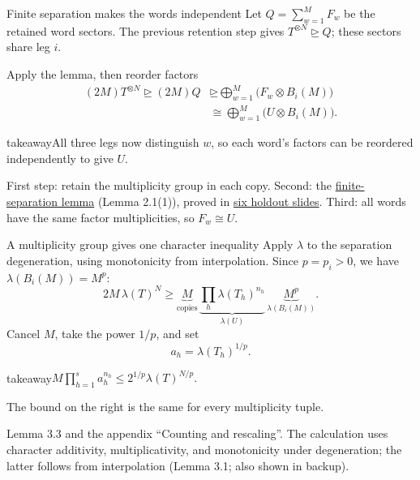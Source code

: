 \documentclass[aspectratio=169,11pt]{beamer}
\newcommand{\degen}{\unrhd}
\newcommand{\source}[1]{\vfill\par{\fontsize{7.5}{9}\selectfont\color{muted}#1\par}}
\newcommand{\takeaway}[1]{\begin{beamercolorbox}[sep=0.65em,wd=\linewidth]{takeaway}#1\end{beamercolorbox}}
\begin{document}
\begin{frame}{Finite separation makes the words independent}
  Let $Q=\sum_{w=1}^{M}F_w$ be the retained word sectors.
  The previous retention step gives $T^{\otimes N}\degen Q$;
  these sectors share leg $i$.
  \begin{block}{Apply the lemma, then reorder factors}
    \[
    \begin{aligned}
      (2M)T^{\otimes N}\degen(2M)Q
        &\degen\bigoplus_{w=1}^{M}\bigl(F_w\otimes B_i(M)\bigr)\\
        &\cong\bigoplus_{w=1}^{M}\bigl(U\otimes B_i(M)\bigr).
    \end{aligned}
    \]
  \end{block}
  \medskip
  \takeaway{All three legs now distinguish $w$, so each word's factors
    can be reordered independently to give $U$.}
  \source{First step: retain the multiplicity group in each copy.
  Second: the \hyperlink{finite-separation-lemma}{finite-separation lemma}
  (Lemma 2.1(1)), proved in \hyperlink{finite-separation-setup}{six holdout slides}.
  Third: all words have the same factor multiplicities, so $F_w\cong U$.}
\end{frame}

\begin{frame}{A multiplicity group gives one character inequality}
  Apply $\lambda$ to the separation degeneration, using monotonicity from
  interpolation. Since $p=p_i>0$, we have $\lambda(B_i(M))=M^p$:
  \[
    2M\,\lambda(T)^N\ge
      \underbrace{M}_{\text{copies}}\,
      \underbrace{\prod_h\lambda(T_h)^{n_h}}_{\lambda(U)}\,
      \underbrace{M^p}_{\lambda(B_i(M))}.
  \]
  Cancel $M$, take the power $1/p$, and set
  \[
    a_h=\lambda(T_h)^{1/p}.
  \]
  \takeaway{$\displaystyle
    M\prod_{h=1}^{s}a_h^{n_h}
      \le2^{1/p}\lambda(T)^{N/p}.
  $}
  \medskip
  The bound on the right is the same for every multiplicity tuple.
  \source{Lemma 3.3 and the appendix ``Counting and rescaling''.
  The calculation uses character additivity, multiplicativity, and
  monotonicity under degeneration; the latter follows from interpolation
  (Lemma 3.1; also shown in backup).}
\end{frame}
\end{document}
